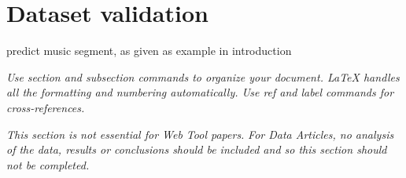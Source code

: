 \section*{Dataset validation}

predict music segment, as given as example in introduction

\textit{Use section and subsection commands to organize your document. \LaTeX{} handles all the formatting and numbering automatically. Use ref and label commands for cross-references.}

\textit{This section is not essential for Web Tool papers. }
\textit{For Data Articles, no analysis of the data, results or conclusions should be included and so this section should not be completed. }